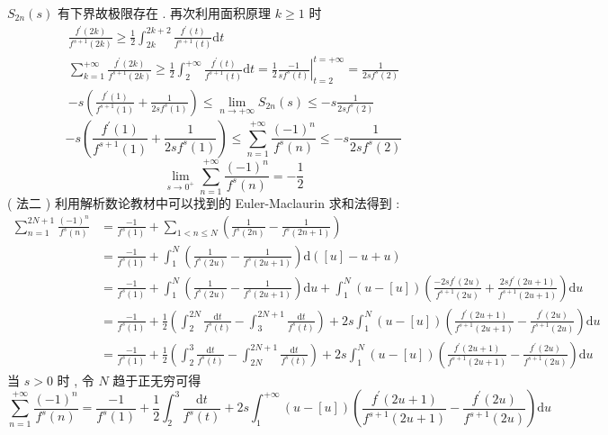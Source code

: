 \documentclass[10pt]{article}
\begin{document}
$S_{2 n}(s)$  有下界故极限存在 .  再次利用面积原理  $k \geqslant 1$  时 
$$
\begin{gathered}
\frac{f^{\prime}(2 k)}{f^{s+1}(2 k)} \geqslant \frac{1}{2} \int_{2 k}^{2 k+2} \frac{f^{\prime}(t)}{f^{s+1}(t)} \mathrm{d} t \\
\sum_{k=1}^{+\infty} \frac{f^{\prime}(2 k)}{f^{s+1}(2 k)} \geqslant \frac{1}{2} \int_{2}^{+\infty} \frac{f^{\prime}(t)}{f^{s+1}(t)} \mathrm{d} t=\left.\frac{1}{2} \frac{-1}{s f^{s}(t)}\right|_{t=2} ^{t=+\infty}=\frac{1}{2 s f^{s}(2)} \\
-s\left(\frac{f^{\prime}(1)}{f^{s+1}(1)}+\frac{1}{2 s f^{s}(1)}\right) \leqslant \lim _{n \rightarrow+\infty} S_{2 n}(s) \leqslant-s \frac{1}{2 s f^{s}(2)}
\end{gathered}
$$
$$
-s\left(\frac{f^{\prime}(1)}{f^{s+1}(1)}+\frac{1}{2 s f^{s}(1)}\right) \leqslant \sum_{n=1}^{+\infty} \frac{(-1)^{n}}{f^{s}(n)} \leqslant-s \frac{1}{2 s f^{s}(2)}
$$
$$
\lim _{s \rightarrow 0^{+}} \sum_{n=1}^{+\infty} \frac{(-1)^{n}}{f^{s}(n)}=-\frac{1}{2}
$$
( 法二 )  利用解析数论教材中可以找到的  Euler-Maclaurin  求和法得到 :
$$
\begin{aligned}
\sum_{n=1}^{2 N+1} \frac{(-1)^{n}}{f^{s}(n)} &=\frac{-1}{f^{s}(1)}+\sum_{1<n \leqslant N}\left(\frac{1}{f^{s}(2 n)}-\frac{1}{f^{s}(2 n+1)}\right) \\
&=\frac{-1}{f^{s}(1)}+\int_{1}^{N}\left(\frac{1}{f^{s}(2 u)}-\frac{1}{f^{s}(2 u+1)}\right) \mathrm{d}([u]-u+u) \\
&=\frac{-1}{f^{s}(1)}+\int_{1}^{N}\left(\frac{1}{f^{s}(2 u)}-\frac{1}{f^{s}(2 u+1)}\right) \mathrm{d} u+\int_{1}^{N}(u-[u])\left(\frac{-2 s f^{\prime}(2 u)}{f^{s+1}(2 u)}+\frac{2 s f^{\prime}(2 u+1)}{f^{s+1}(2 u+1)}\right) \mathrm{d} u \\
&=\frac{-1}{f^{s}(1)}+\frac{1}{2}\left(\int_{2}^{2 N} \frac{\mathrm{d} t}{f^{s}(t)}-\int_{3}^{2 N+1} \frac{\mathrm{d} t}{f^{s}(t)}\right)+2 s \int_{1}^{N}(u-[u])\left(\frac{f^{\prime}(2 u+1)}{f^{s+1}(2 u+1)}-\frac{f^{\prime}(2 u)}{f^{s+1}(2 u)}\right) \mathrm{d} u \\
&=\frac{-1}{f^{s}(1)}+\frac{1}{2}\left(\int_{2}^{3} \frac{\mathrm{d} t}{f^{s}(t)}-\int_{2 N}^{2 N+1} \frac{\mathrm{d} t}{f^{s}(t)}\right)+2 s \int_{1}^{N}(u-[u])\left(\frac{f^{\prime}(2 u+1)}{f^{s+1}(2 u+1)}-\frac{f^{\prime}(2 u)}{f^{s+1}(2 u)}\right) \mathrm{d} u
\end{aligned}
$$
 当  $s>0$  时 ,  令  $N$  趋于正无穷可得 
$$
\sum_{n=1}^{+\infty} \frac{(-1)^{n}}{f^{s}(n)}=\frac{-1}{f^{s}(1)}+\frac{1}{2} \int_{2}^{3} \frac{\mathrm{d} t}{f^{s}(t)}+2 s \int_{1}^{+\infty}(u-[u])\left(\frac{f^{\prime}(2 u+1)}{f^{s+1}(2 u+1)}-\frac{f^{\prime}(2 u)}{f^{s+1}(2 u)}\right) \mathrm{d} u
$$
\end{document}
